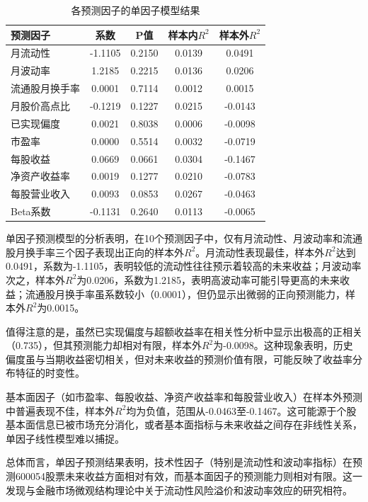 \documentclass[12pt, a4paper]{article}
\begin{document}
\begin{table}[htbp]
\centering
\caption{各预测因子的单因子模型结果}
\label{tab:single_factor_stock}
\begin{tabular}{lcccc}
\toprule
预测因子 & 系数 & P值 & 样本内$R^2$ & 样本外$R^2$ \\
\midrule
月流动性 & -1.1105 & 0.2150 & 0.0139 & 0.0491 \\
月波动率 & 1.2185 & 0.2215 & 0.0136 & 0.0206 \\
流通股月换手率 & 0.0001 & 0.7114 & 0.0012 & 0.0015 \\
月股价高点比 & -0.1219 & 0.1227 & 0.0215 & -0.0143 \\
已实现偏度 & 0.0021 & 0.8038 & 0.0006 & -0.0098 \\
市盈率 & 0.0000 & 0.5514 & 0.0032 & -0.0719 \\
每股收益 & 0.0669 & 0.0661 & 0.0304 & -0.1467 \\
净资产收益率 & 0.0019 & 0.1277 & 0.0210 & -0.0783 \\
每股营业收入 & 0.0093 & 0.0853 & 0.0267 & -0.0463 \\
Beta系数 & -0.1131 & 0.2640 & 0.0113 & -0.0065 \\
\bottomrule
\end{tabular}
\end{table}

单因子预测模型的分析表明，在10个预测因子中，仅有月流动性、月波动率和流通股月换手率三个因子表现出正向的样本外$R^2$。月流动性表现最佳，样本外$R^2$达到0.0491，系数为-1.1105，表明较低的流动性往往预示着较高的未来收益；月波动率次之，样本外$R^2$为0.0206，系数为1.2185，表明高波动率可能引导更高的未来收益；流通股月换手率虽系数较小（0.0001），但仍显示出微弱的正向预测能力，样本外$R^2$为0.0015。

值得注意的是，虽然已实现偏度与超额收益率在相关性分析中显示出极高的正相关（0.735），但其预测能力却相对有限，样本外$R^2$为-0.0098。这种现象表明，历史偏度虽与当期收益密切相关，但对未来收益的预测价值有限，可能反映了收益率分布特征的时变性。

基本面因子（如市盈率、每股收益、净资产收益率和每股营业收入）在样本外预测中普遍表现不佳，样本外$R^2$均为负值，范围从-0.0463至-0.1467。这可能源于个股基本面信息已被市场充分消化，或者基本面指标与未来收益之间存在非线性关系，单因子线性模型难以捕捉。

总体而言，单因子预测结果表明，技术性因子（特别是流动性和波动率指标）在预测600054股票未来收益方面相对有效，而基本面因子的预测能力则相对有限。这一发现与金融市场微观结构理论中关于流动性风险溢价和波动率效应的研究相符。
\end{document}
